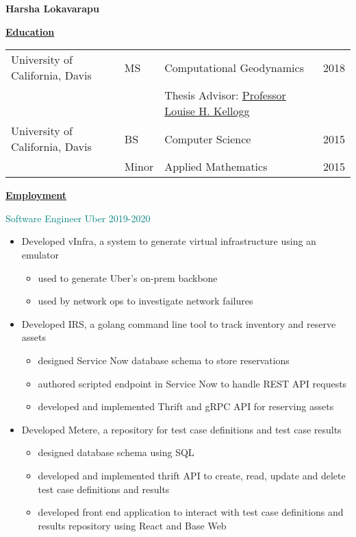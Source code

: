 \documentclass[11pt]{ltxdoc}
\begin{document}
\begin{center}
  \textbf{Harsha Lokavarapu}
\end{center}
\vskip -10pt

\textbf{\underline{Education}}

\vskip -06pt

\begin{tabular}{llll}
University of California, Davis              &MS       &Computational Geodynamics      & 2018 \\
                                             &       &Thesis Advisor: \href{http://geology.ucdavis.edu/people/faculty/kellogg.php}{Professor Louise H. Kellogg}        &  \\
University of California, Davis              &BS      & Computer Science                         & 2015       \\
                                             &Minor   & Applied Mathematics                      & 2015
\end{tabular}


\vskip -10pt
\textbf{\underline{Employment}}

		{\textcolor{teal}{Software Engineer} \hfill \textcolor{teal}{Uber} \hfill \textcolor{teal}{2019-2020}}
		\begin{itemize}
			\item Developed vInfra, a system to generate virtual infrastructure using an emulator
			\begin{itemize}
				\item used to generate Uber's on-prem backbone
				\item used by network ops to investigate network failures
			\end {itemize}
			
			\item Developed IRS, a golang command line tool to track inventory and reserve assets
			\begin{itemize}
				\item designed Service Now database schema to store reservations
				\item authored scripted endpoint in Service Now to handle REST API requests
				\item developed and implemented Thrift and gRPC API for reserving assets
			\end {itemize}
			
			\item Developed Metere, a repository for test case definitions and test case results
		 	\begin{itemize}
		 	  \item designed database schema using SQL
		 	  \item developed and implemented thrift API to create, read, update and delete test case definitions and results
		 	  \item developed front end application to interact with test case definitions and results repository using React and Base Web
		 	\end{itemize}
	 	\end{itemize}
\end{document}
